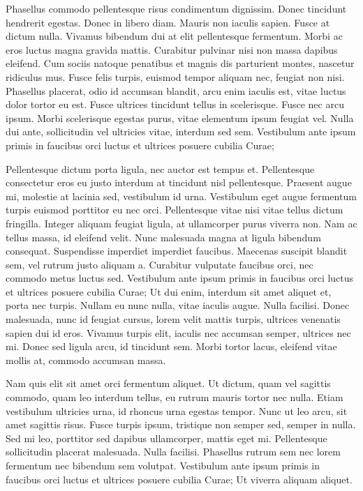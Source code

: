 \documentclass[twocolumn]{article}
\begin{document}
Phasellus commodo pellentesque risus condimentum dignissim. Donec tincidunt hendrerit egestas. Donec in libero diam. Mauris non iaculis sapien. Fusce at dictum nulla. Vivamus bibendum dui at elit pellentesque fermentum. Morbi ac eros luctus magna gravida mattis. Curabitur pulvinar nisi non massa dapibus eleifend. Cum sociis natoque penatibus et magnis dis parturient montes, nascetur ridiculus mus. Fusce felis turpis, euismod tempor aliquam nec, feugiat non nisi. Phasellus placerat, odio id accumsan blandit, arcu enim iaculis est, vitae luctus dolor tortor eu est. Fusce ultrices tincidunt tellus in scelerisque. Fusce nec arcu ipsum. Morbi scelerisque egestas purus, vitae elementum ipsum feugiat vel. Nulla dui ante, sollicitudin vel ultricies vitae, interdum sed sem. Vestibulum ante ipsum primis in faucibus orci luctus et ultrices posuere cubilia Curae;

Pellentesque dictum porta ligula, nec auctor est tempus et. Pellentesque consectetur eros eu justo interdum at tincidunt nisl pellentesque. Praesent augue mi, molestie at lacinia sed, vestibulum id urna. Vestibulum eget augue fermentum turpis euismod porttitor eu nec orci. Pellentesque vitae nisi vitae tellus dictum fringilla. Integer aliquam feugiat ligula, at ullamcorper purus viverra non. Nam ac tellus massa, id eleifend velit. Nunc malesuada magna at ligula bibendum consequat. Suspendisse imperdiet imperdiet faucibus. Maecenas suscipit blandit sem, vel rutrum justo aliquam a. Curabitur vulputate faucibus orci, nec commodo metus luctus sed. Vestibulum ante ipsum primis in faucibus orci luctus et ultrices posuere cubilia Curae; Ut dui enim, interdum sit amet aliquet et, porta nec turpis. Nullam eu nunc nulla, vitae iaculis augue. Nulla facilisi. Donec malesuada, nunc id feugiat cursus, lorem velit mattis turpis, ultrices venenatis sapien dui id eros. Vivamus turpis elit, iaculis nec accumsan semper, ultrices nec mi. Donec sed ligula arcu, id tincidunt sem. Morbi tortor lacus, eleifend vitae mollis at, commodo accumsan massa.

Nam quis elit sit amet orci fermentum aliquet. Ut dictum, quam vel sagittis commodo, quam leo interdum tellus, eu rutrum mauris tortor nec nulla. Etiam vestibulum ultricies urna, id rhoncus urna egestas tempor. Nunc ut leo arcu, sit amet sagittis risus. Fusce turpis ipsum, tristique non semper sed, semper in nulla. Sed mi leo, porttitor sed dapibus ullamcorper, mattis eget mi. Pellentesque sollicitudin placerat malesuada. Nulla facilisi. Phasellus rutrum sem nec lorem fermentum nec bibendum sem volutpat. Vestibulum ante ipsum primis in faucibus orci luctus et ultrices posuere cubilia Curae; Ut viverra aliquam aliquet.
\end{document}

